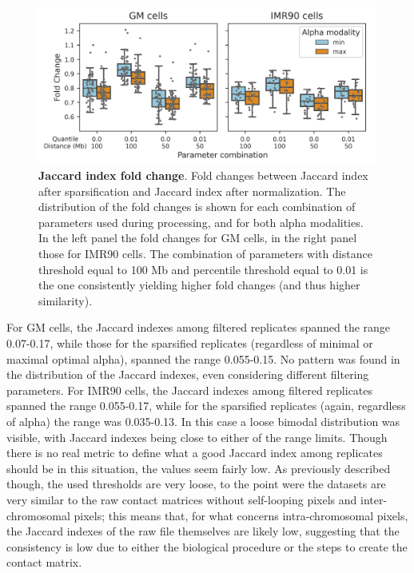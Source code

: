 \begin{figure}[h]
  \centering 
  \includegraphics[width=1\textwidth]{fold_changes.png}
  \caption{\textbf{Jaccard index fold change}. Fold changes between Jaccard index after sparsification and Jaccard index after normalization. The distribution of the fold changes is shown for each combination of parameters used during processing, and for both alpha modalities. In the left panel the fold changes for GM cells, in the right panel those for IMR90 cells. The combination of parameters with distance threshold equal to 100 Mb and percentile threshold equal to 0.01 is the one consistently yielding higher fold changes (and thus higher similarity).}
  \label{fig:foldchanges}
\end{figure}

For GM cells, the Jaccard indexes among filtered replicates spanned the range 0.07-0.17, while those for the sparsified replicates (regardless of minimal or maximal optimal alpha), spanned the range 0.055-0.15. No pattern was found in the distribution of the Jaccard indexes, even considering different filtering parameters. For IMR90 cells, the Jaccard indexes among filtered replicates spanned the range 0.055-0.17, while for the sparsified replicates (again, regardless of alpha) the range was 0.035-0.13. In this case a loose bimodal distribution was visible, with Jaccard indexes being close to either of the range limits. Though there is no real metric to define what a good Jaccard index among replicates should be in this situation, the values seem fairly low. As previously described though, the used thresholds are very loose, to the point were the datasets are very similar to the raw contact matrices without self-looping pixels and inter-chromosomal pixels; this means that, for what concerns intra-chromosomal pixels, the Jaccard indexes of the raw file themselves are likely low, suggesting that the consistency is low due to either the biological procedure or the steps to create the contact matrix.

